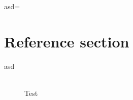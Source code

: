 \documentclass{article}
\begin{document}
asd=
\pagebreak
\section*{Reference section} \label{sec:reference}
\begin{description}
	\item [asd] \hfill \\ Test
\end{description}
\end{document}
